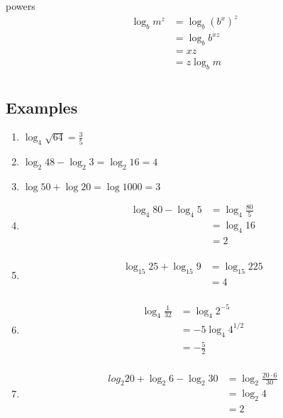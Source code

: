 \documentclass{exam}
\begin{document}
  powers
  \begin{align*}
    \log_b m^z &= \log_b \left( b^x \right)^z \\
               &= \log_b b^{xz} \\
               &= xz \\
               &= z \log_b m \\
  \end{align*}

  \subsection{Examples}

  \begin{enumerate}
    \item $\log_4 \sqrt{64} = \frac{3}{5}$

    \item $\log_2 48 - \log_2 3 = \log_2 16 = 4$

    \item $\log 50 + \log 20 = \log 1000 = 3$

    \item 
      \begin{align*}
        \log_4 80 - \log_4 5 &= \log_4 \frac{80}{5} \\
                             &= \log_4 16 \\
                             &= 2 \\
      \end{align*}

    \item
      \begin{align*}
        \log_{15} 25 + \log_{15} 9 &= \log_{15} 225 \\
                                   &= 4 \\
      \end{align*}

    \item
      \begin{align*}
        \log_4 \frac{1}{32} &= \log_4 2^{-5} \\
                            &= -5 \log_4 4^{1/2} \\
                            &= - \frac{5}{2} \\
      \end{align*}

    \item
      \begin{align*}
        log_2 20 + \log_2 6 - \log_2 30 &= \log_2 \frac{20 \cdot 6}{30} \\
                                        &= \log_2 4 \\
                                        &= 2 \\
      \end{align*}


\end{enumerate}
\end{document}
